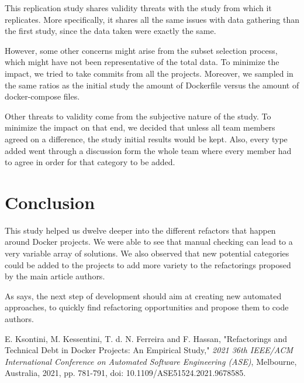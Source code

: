 \documentclass[lettersize,journal]{IEEEtran}
\begin{document}
This replication study shares validity threats with the study from \cite{1} which it replicates.
More specifically, it shares all the same issues with data gathering than the first study, since the data taken were exactly the same.

However, some other concerns might arise from the subset selection process, which might have not been representative of the total data.
To minimize the impact, we tried to take commits from all the projects.
Moreover, we sampled in the same ratios as the initial study the amount of Dockerfile versus the amount of docker-compose files.

Other threats to validity come from the subjective nature of the study.
To minimize the impact on that end, we decided that unless all team members agreed on a difference, the study initial results would be kept.
Also, every type added went through a discussion form the whole team where every member had to agree in order for that category to be added.

\section{Conclusion}
This study helped us dwelve deeper into the different refactors that happen around Docker projects.
We were able to see that manual checking can lead to a very variable array of solutions.
We also observed that new potential categories could be added to the projects to add more variety to the refactorings proposed by the main article authors.

As \cite{1} says, the next step of development should aim at creating new automated approaches, to quickly find refactoring opportunities and propose them to code authors.

\begin{thebibliography}{1}


E. Ksontini, M. Kessentini, T. d. N. Ferreira and F. Hassan, "Refactorings and Technical Debt in Docker Projects: An Empirical Study," \textit{2021 36th IEEE/ACM International Conference on Automated Software Engineering (ASE)}, Melbourne, Australia, 2021, pp. 781-791, doi: 10.1109/ASE51524.2021.9678585.

\end{thebibliography}

\vfill
\end{document}
